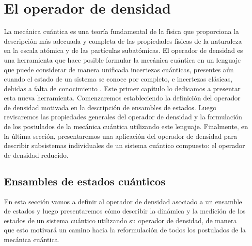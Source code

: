 \chapter{El operador de densidad} %
La mecánica cuántica es una teoría fundamental de la física que
proporciona la descripción más adecuada y completa de las propiedades
físicas de la naturaleza en la escala atómica y de las partículas 
subatómicas. El operador de densidad es una herramienta
que hace posible formular la mecánica cuántica en un lenguaje
que puede considerar de manera unificada incertezas cuánticas, 
presentes aún cuando el estado de un sistema se conoce 
por completo, e incertezas clásicas, 
debidas a falta de conocimiento \cite{sakurai2010modern}.
Este primer capítulo lo dedicamos a presentar esta nueva herramienta.
Comenzaremos estableciendo la definición del operador de densidad
motivada en la descripción de ensambles de estados. Luego
revisaremos las propiedades generales del operador de densidad y la 
formulación de los postulados de la mecánica cuántica utilizando este
lenguaje. Finalmente, en la última sección, presentaremos una aplicación 
del operador de densidad para describir subsistemas individuales 
de un sistema cuántico compuesto: el operador de densidad reducido.



\section{Ensambles de estados cuánticos} %
En esta sección vamos a definir al operador de densidad asociado a 
un ensamble de estados y luego presentaremos cómo describir la dinámica
y la medición de los estados de un sistema cuántico utilizando 
su operador de densidad, 
de manera que esto motivará un camino hacia la reformulación
de todos los postulados de la mecánica cuántica.

